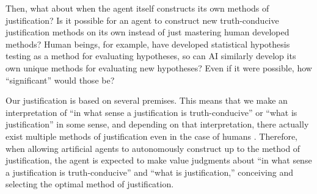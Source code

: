Then, what about when the agent itself constructs its own methods of justification? Is it possible for an agent to construct new truth-conducive justification methods on its own instead of just mastering human developed methods? Human beings, for example, have developed statistical hypothesis testing as a method for evaluating hypotheses, so can AI similarly develop its own unique methods for evaluating new hypotheses? Even if it were possible, how ``significant'' would those be?

Our justification is based on several premises. This means that we make an interpretation of ``in what sense a justification is truth-conducive'' or ``what is justification'' in some sense, and depending on that interpretation, there actually exist multiple methods of justification even in the case of humans \cite{otsuka2022thinking}. Therefore, when allowing artificial agents to autonomously construct up to the method of justification, the agent is expected to make value judgments about ``in what sense a justification is truth-conducive'' and ``what is justification,'' conceiving and selecting the optimal method of justification. 


